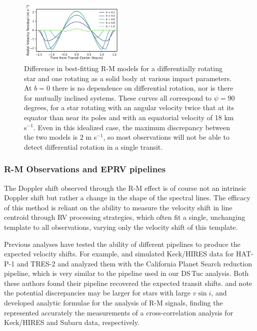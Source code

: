 \documentclass[twocolumn]{aastex63}
\newcommand{\vsini}{{$v \sin i$}}
\begin{document}
\begin{figure}[!tbh]
  \begin{center}
    \includegraphics[width=0.45\textwidth, trim={0cm 0.0cm 0cm 0cm}, clip=true]{../figures/diff_rot.pdf}
   \end{center}
  \caption{Difference in best-fitting R-M models for a differentially rotating star and one rotating as a solid body at various impact parameters. At $b=0$ there is no dependence on differential rotation, nor is there for mutually inclined systems. These curves all correspond to $\psi = 90$ degrees, for a star rotating with an angular velocity twice that at its equator than near its poles and with an equatorial velocity of 18 km s$^{-1}$. Even in this idealized case, the maximum discrepancy between the two models is 2 m s$^{-1}$, so most observations will not be able to detect differential rotation in a single transit. }
  \label{fig:diff_rot}
\end{figure}


\subsubsection{R-M Observations and EPRV pipelines}

The Doppler shift observed through the R-M effect is of course not an intrinsic Doppler shift but rather a change in the shape of the spectral lines. 
The efficacy of this method is reliant on the ability to measure the velocity shift in line centroid through RV processing strategies, which often fit a single, unchanging template to all observations, varying only the velocity shift of this template. 

Previous analyses have tested the ability of different pipelines to produce the expected velocity shifts. For example, \citet{Winn08} and \citet{Johnson08} simulated Keck/HIRES data for HAT-P-1 and TRES-2 and analyzed them with the California Planet Search reduction pipeline, which is very similar to the pipeline used in our DS\,Tuc analysis.
Both these authors found their pipeline recovered the expected transit shifts. \citet{Winn05} and \citet{Hirano10} note the potential discrepancies may be larger for stars with large \vsini, and developed analytic formulae for the analysis of R-M signals, finding the represented accurately the measurements of a cross-correlation analysis for Keck/HIRES and Subaru data, respectively.
\end{document}
